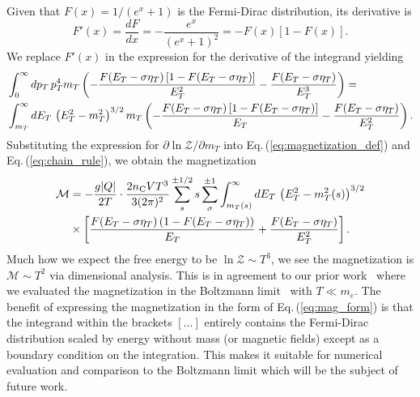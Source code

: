 \documentclass[epjST]{svjour}
\newcommand{\req}[1]{Eq.\,(\ref{#1})}
\begin{document}
Given that \( F(x) = 1/(e^{x} + 1) \) is the Fermi-Dirac distribution, its derivative is
\begin{equation}
F'(x) = \frac{dF}{dx} = -\frac{e^{x}}{(e^{x} + 1)^2} = -F(x)\left[1 - F(x)\right].
\end{equation}
We replace \( F'(x) \) in the expression for the derivative of the integrand yielding
\begin{align}
    \notag
    &\int_{0}^{\infty} dp_{T} \, p_{T}^{4} m_{T} \left( -\frac{F(E_{T} - \sigma\eta_{T})\left[1 - F(E_{T} - \sigma\eta_{T})\right]}{E_{T}^{2}} - \frac{F(E_{T} - \sigma\eta_{T})}{E_{T}^{3}} \right) =\\*
    &\int_{m_{T}}^{\infty} dE_{T} \, \left(E_{T}^{2} - m_{T}^{2}\right)^{3/2} m_{T} \left( -\frac{F(E_{T} - \sigma\eta_{T})\left[1 - F(E_{T} - \sigma\eta_{T})\right]}{E_{T}} - \frac{F(E_{T} - \sigma\eta_{T})}{E_{T}^{2}} \right).
\end{align}
Substituting the expression for \(\partial \ln \mathcal{Z}/\partial m_{T}\) into \req{eq:magnetization_def} and \req{eq:chain_rule}, we obtain the magnetization
\begin{align}
    \notag
    \mathcal{M} &= -\frac{g|Q|}{2 T}\cdot\frac{2 n_\mathrm{C} V T^{3}}{3 (2\pi)^{2}} \sum_{s}^{\pm1/2} s \sum_{\sigma}^{\pm1} \int_{m_{T}(s)}^{\infty} dE_{T} \, \left(E_{T}^{2} - m_{T}^{2}(s)\right)^{3/2} \\
    \label{eq:mag_form}
    &\times
    \left[ \frac{F(E_{T} - \sigma\eta_{T})\left(1 - F(E_{T} - \sigma\eta_{T})\right)}{E_{T}} + \frac{F(E_{T} - \sigma\eta_{T})}{E_{T}^{2}} \right].
\end{align}
Much how we expect the free energy to be \(\ln\mathcal{Z}\sim T^{3}\), we see the magnetization is \(\mathcal{M}\sim T^{2}\) via dimensional analysis. This is in agreement to our prior work~\cite{Steinmetz:2023nsc,Steinmetz:2023ucp} where we evaluated the magnetization in the Boltzmann limit~\cite{Steinmetz:2023nsc} with \(T\ll m_e\). The benefit of expressing the magnetization in the form of \req{eq:mag_form} is that the integrand within the brackets \([\ldots]\) entirely contains the Fermi-Dirac distribution scaled by energy without mass (or magnetic fields) except as a boundary condition on the integration. This makes it suitable for numerical evaluation and comparison to the Boltzmann limit which will be the subject of future work.

\end{document}
